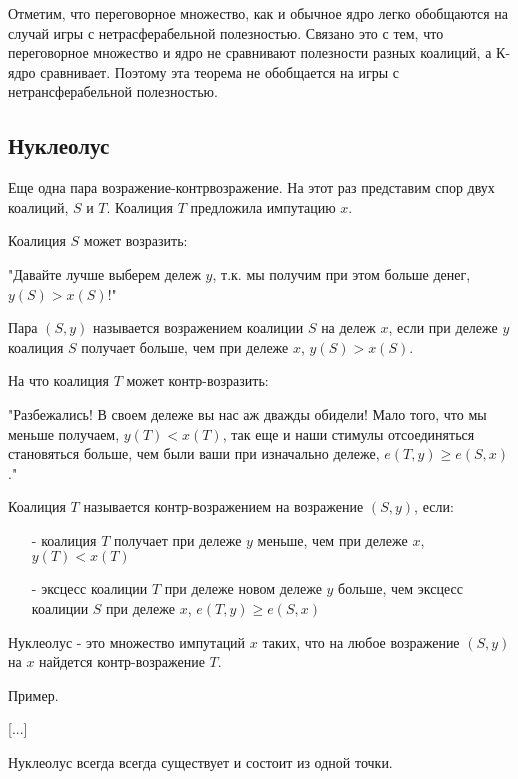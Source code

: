 Отметим, что переговорное множество, как и обычное ядро легко обобщаются на случай игры с нетрасферабельной полезностью. Связано это с тем, что переговорное множество и ядро не сравнивают полезности разных коалиций, а К-ядро сравнивает. Поэтому эта теорема не обобщается на игры с нетрансферабельной полезностью. 

\subsection{Нуклеолус}

Еще одна пара возражение-контрвозражение. На этот раз представим спор двух коалиций, $S$ и $T$. Коалиция $T$ предложила импутацию $x$.

Коалиция $S$ может возразить:

"Давайте лучше выберем дележ $y$, т.к. мы получим при этом больше денег, $y(S)>x(S)$!"
\begin{definition}
Пара $(S,y)$ называется возражением коалиции $S$ на дележ $x$, если при дележе $y$ коалиция $S$ получает больше, чем при дележе $x$, $y(S)>x(S)$.
\end{definition}

На что коалиция $T$ может контр-возразить:

"Разбежались! В своем дележе вы нас аж дважды обидели! Мало того, что мы меньше получаем, $y(T)<x(T)$, так еще и наши стимулы отсоединяться становяться больше, чем были ваши при изначально дележе, $e(T,y)\geq e(S,x)$."
\begin{definition}
Коалиция $T$ называется контр-возражением на возражение $(S,y)$, если:
\begin{itemize}
\item[-] коалиция $T$ получает при дележе $y$ меньше, чем при дележе $x$, $y(T)<x(T)$
\item[-] эксцесс коалиции $T$ при дележе новом дележе $y$ больше, чем эксцесс коалиции $S$ при дележе $x$, $e(T,y)\geq e(S,x)$
\end{itemize}
\end{definition}


\begin{definition}
Нуклеолус - это множество импутаций $x$ таких, что на любое возражение $(S,y)$ на $x$ найдется контр-возражение $T$.
\end{definition}


Пример.


[...]



\begin{theorem}
Нуклеолус всегда всегда существует и состоит из одной точки.
\end{theorem}

